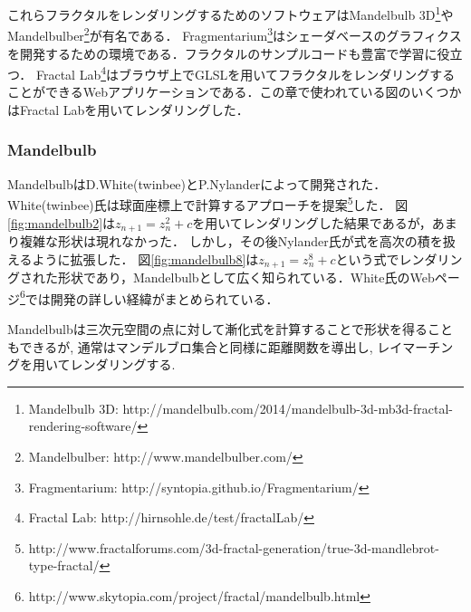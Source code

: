 これらフラクタルをレンダリングするためのソフトウェアはMandelbulb 3D\footnote{Mandelbulb 3D: http://mandelbulb.com/2014/mandelbulb-3d-mb3d-fractal-rendering-software/}やMandelbulber\footnote{Mandelbulber: http://www.mandelbulber.com/}が有名である．
Fragmentarium\footnote{Fragmentarium: http://syntopia.github.io/Fragmentarium/}はシェーダベースのグラフィクスを開発するための環境である．フラクタルのサンプルコードも豊富で学習に役立つ．
Fractal Lab\footnote{Fractal Lab: http://hirnsohle.de/test/fractalLab/}はブラウザ上でGLSLを用いてフラクタルをレンダリングすることができるWebアプリケーションである．この章で使われている図のいくつかはFractal Labを用いてレンダリングした．

\subsubsection{Mandelbulb}

MandelbulbはD.White(twinbee)とP.Nylanderによって開発された．
White(twinbee)氏は球面座標上で計算するアプローチを提案\footnote{http://www.fractalforums.com/3d-fractal-generation/true-3d-mandlebrot-type-fractal/}した．
図\ref{fig:mandelbulb2}は$z_{n+1} = z_n^2 + c$を用いてレンダリングした結果であるが，あまり複雑な形状は現れなかった．
しかし，その後Nylander氏が式を高次の積を扱えるように拡張した．
図\ref{fig:mandelbulb8}は$z_{n+1} = z_n^8 + c $という式でレンダリングされた形状であり，Mandelbulbとして広く知られている．White氏のWebページ\footnote{http://www.skytopia.com/project/fractal/mandelbulb.html}では開発の詳しい経緯がまとめられている．

Mandelbulbは三次元空間の点に対して漸化式を計算することで形状を得ることもできるが, 通常はマンデルブロ集合と同様に距離関数を導出し, レイマーチングを用いてレンダリングする.

